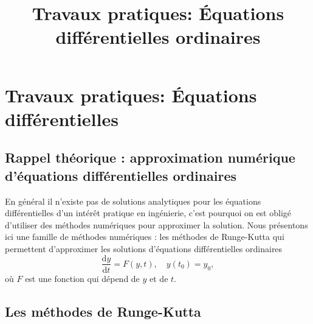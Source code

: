 \documentclass[a4paper,10pt]{article}
\title{Travaux pratiques: \'Equations différentielles ordinaires}
\newcommand{\dd}{\mathrm{d}}
\begin{document}
\maketitle

\section*{Travaux pratiques: Équations différentielles}

\subsection*{Rappel théorique : approximation numérique d’équations
différentielles ordinaires}

En général il n’existe pas de solutions analytiques pour les équations différentielles d’un intérêt pratique en ingénierie, 
c’est pourquoi on est obligé d’utiliser des méthodes
numériques pour approximer la solution.
Nous présentons ici une famille de méthodes numériques : les méthodes de
Runge-Kutta qui permettent d’approximer
les solutions d’équations différentielles ordinaires
\begin{equation*}
 \frac{\dd y}{\dd t} = F(y,t), \quad y(t_0)=y_0,
\end{equation*}
où $F$ est une fonction qui dépend de $y$ et de $t$.

\subsection*{Les méthodes de Runge-Kutta}
\end{document}
